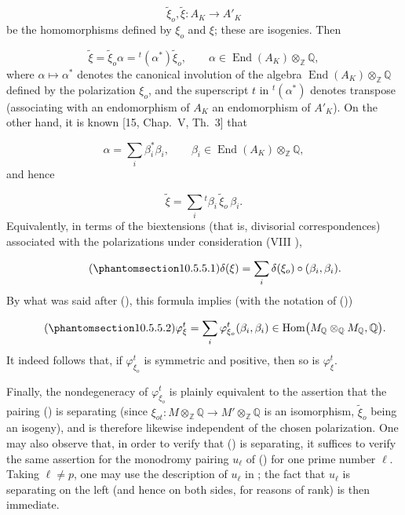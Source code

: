 \begin{equation*}
\widetilde\xi_o,\widetilde\xi:A_K\longrightarrow A'_K
\end{equation*}
be the homomorphisms defined by $\xi_o$ and $\xi$; these are isogenies.
Then

\begin{equation*}
\widetilde\xi=\widetilde\xi_o\alpha
 ={}^t(\alpha^*)\widetilde\xi_o,
 \qquad
\alpha\in\operatorname{End}(A_K)\otimes_{\mathbb Z}\mathbb Q,
\end{equation*}
where $\alpha\longmapsto\alpha^*$ denotes the canonical involution of
the algebra $\operatorname{End}(A_K)\otimes_{\mathbb Z}\mathbb Q$
defined by the polarization $\xi_o$, and the superscript $t$ in
${}^t(\alpha^*)$ denotes transpose (associating with an endomorphism of
$A_K$ an endomorphism of $A'_K$). On the other hand, it is known
[15, Chap.~V, Th.~3] that

\begin{equation*}
\alpha=\sum_i\beta_i^*\beta_i,
 \qquad
\beta_i\in\operatorname{End}(A_K)\otimes_{\mathbb Z}\mathbb Q,
\end{equation*}
and hence

\begin{equation*}
\widetilde\xi=\sum_i{}^t\beta_i\,\widetilde\xi_o\,\beta_i.
\end{equation*}
Equivalently, in terms of the biextensions (that is, divisorial
correspondences) associated with the polarizations under consideration
(VIII ),

\begin{equation}\tag{\SGARefTarget{sga7.sga7i.eix.n10-5-5-1}{10.5.5.1}}
\delta(\xi)=\sum_i\delta(\xi_o)\circ(\beta_i,\beta_i).
\end{equation}
By what was said after (), this formula implies (with the notation
of ())

\begin{equation}\tag{\SGARefTarget{sga7.sga7i.eix.n10-5-5-2}{10.5.5.2}}
\varphi^t_\xi
 =\sum_i\varphi^t_{\xi_o}(\beta_i,\beta_i)
 \in\operatorname{Hom}
 \bigl(M_{\mathbb Q}\otimes_{\mathbb Q}M_{\mathbb Q},\mathbb Q\bigr).
\end{equation}
It indeed follows that, if $\varphi^t_{\xi_o}$ is symmetric and positive,
then so is $\varphi^t_\xi$.

Finally, the nondegeneracy of $\varphi^t_{\xi_o}$ is plainly equivalent
to the assertion that the pairing () is separating (since
$\xi_{ot}:M\otimes_{\mathbb Z}\mathbb Q
\longrightarrow M'\otimes_{\mathbb Z}\mathbb Q$ is an isomorphism,
$\widetilde\xi_o$ being an isogeny), and is therefore likewise
independent of the chosen polarization. One may also observe that, in
order to verify that () is separating, it suffices to verify the
same assertion for the monodromy pairing $u_\ell$ of () for one
prime number $\ell$. Taking $\ell\ne p$, one may use the description of
$u_\ell$ in ; the fact that $u_\ell$ is separating on the left (and
hence on both sides, for reasons of rank) is then immediate.
